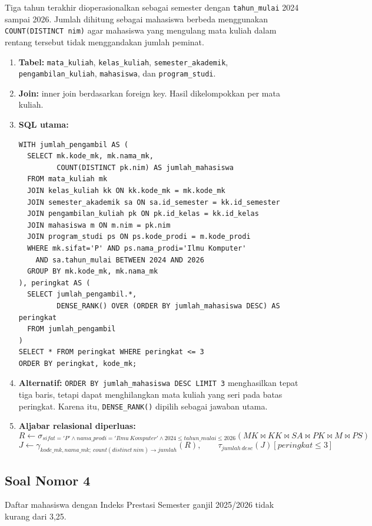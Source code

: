 Tiga tahun terakhir dioperasionalkan sebagai semester dengan \texttt{tahun\_mulai} 2024 sampai 2026. Jumlah dihitung sebagai mahasiswa berbeda menggunakan \texttt{COUNT(DISTINCT nim)} agar mahasiswa yang mengulang mata kuliah dalam rentang tersebut tidak menggandakan jumlah peminat.

\begin{enumerate}[noitemsep]
\item \textbf{Tabel:} \texttt{mata\_kuliah}, \texttt{kelas\_kuliah}, \texttt{semester\_akademik}, \texttt{pengambilan\_kuliah}, \texttt{mahasiswa}, dan \texttt{program\_studi}.
\item \textbf{Join:} inner join berdasarkan foreign key. Hasil dikelompokkan per mata kuliah.
\item \textbf{SQL utama:}
\begin{lstlisting}
WITH jumlah_pengambil AS (
  SELECT mk.kode_mk, mk.nama_mk,
         COUNT(DISTINCT pk.nim) AS jumlah_mahasiswa
  FROM mata_kuliah mk
  JOIN kelas_kuliah kk ON kk.kode_mk = mk.kode_mk
  JOIN semester_akademik sa ON sa.id_semester = kk.id_semester
  JOIN pengambilan_kuliah pk ON pk.id_kelas = kk.id_kelas
  JOIN mahasiswa m ON m.nim = pk.nim
  JOIN program_studi ps ON ps.kode_prodi = m.kode_prodi
  WHERE mk.sifat='P' AND ps.nama_prodi='Ilmu Komputer'
    AND sa.tahun_mulai BETWEEN 2024 AND 2026
  GROUP BY mk.kode_mk, mk.nama_mk
), peringkat AS (
  SELECT jumlah_pengambil.*,
         DENSE_RANK() OVER (ORDER BY jumlah_mahasiswa DESC) AS peringkat
  FROM jumlah_pengambil
)
SELECT * FROM peringkat WHERE peringkat <= 3
ORDER BY peringkat, kode_mk;
\end{lstlisting}
\item \textbf{Alternatif:} \texttt{ORDER BY jumlah\_mahasiswa DESC LIMIT 3} menghasilkan tepat tiga baris, tetapi dapat menghilangkan mata kuliah yang seri pada batas peringkat. Karena itu, \texttt{DENSE\_RANK()} dipilih sebagai jawaban utama.
\item \textbf{Aljabar relasional diperluas:}
\[
R\leftarrow\sigma_{sifat='P'\wedge nama\_prodi='Ilmu\ Komputer'\wedge 2024\le tahun\_mulai\le2026}
(MK\bowtie KK\bowtie SA\bowtie PK\bowtie M\bowtie PS)
\]
\[
J\leftarrow\gamma_{kode\_mk,nama\_mk;\ count(distinct\ nim)\rightarrow jumlah}(R),\qquad
\tau_{jumlah\ desc}(J)[peringkat\le3]
\]
\end{enumerate}

\subsection{Soal Nomor 4}
\begin{tcolorbox}
Daftar mahasiswa dengan Indeks Prestasi Semester ganjil 2025/2026 tidak kurang dari 3,25.
\end{tcolorbox}

